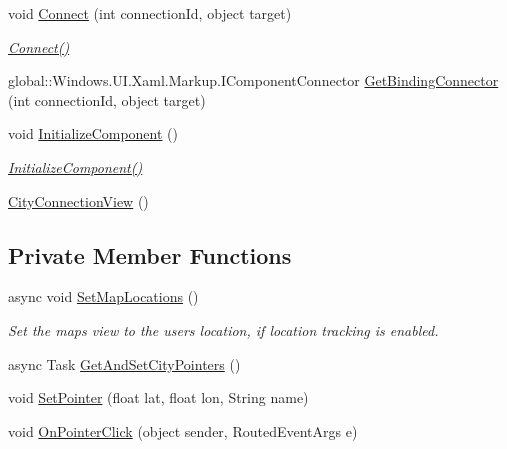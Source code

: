 \begin{DoxyCompactItemize}
void \hyperlink{class_e_l_i_client_1_1_views_1_1_city_connection_view_a55fa5d837de3be96ef7141ee6f29c3f3}{Connect} (int connection\+Id, object target)
\begin{DoxyCompactList}\small\item\em \hyperlink{class_e_l_i_client_1_1_views_1_1_city_connection_view_a55fa5d837de3be96ef7141ee6f29c3f3}{Connect()} \end{DoxyCompactList}\item 
global\+::\+Windows.\+U\+I.\+Xaml.\+Markup.\+I\+Component\+Connector \hyperlink{class_e_l_i_client_1_1_views_1_1_city_connection_view_a947cde31ff8c188fced9e4a3a33c3964}{Get\+Binding\+Connector} (int connection\+Id, object target)
\item 
void \hyperlink{class_e_l_i_client_1_1_views_1_1_city_connection_view_af7c195ef8947d0938788bc361077f177}{Initialize\+Component} ()
\begin{DoxyCompactList}\small\item\em \hyperlink{class_e_l_i_client_1_1_views_1_1_city_connection_view_af7c195ef8947d0938788bc361077f177}{Initialize\+Component()} \end{DoxyCompactList}\item 
\hyperlink{class_e_l_i_client_1_1_views_1_1_city_connection_view_a7cbd9995c6d5b65090de9dc901ca56ab}{City\+Connection\+View} ()
\end{DoxyCompactItemize}
\subsection*{Private Member Functions}
\begin{DoxyCompactItemize}
\item 
async void \hyperlink{class_e_l_i_client_1_1_views_1_1_city_connection_view_a555d2a0e3752bdbe5c75e9c1e2ac7167}{Set\+Map\+Locations} ()
\begin{DoxyCompactList}\small\item\em Set the maps view to the users location, if location tracking is enabled. \end{DoxyCompactList}\item 
async Task \hyperlink{class_e_l_i_client_1_1_views_1_1_city_connection_view_a6b98313a103b94f68425a9c20db647cc}{Get\+And\+Set\+City\+Pointers} ()
\item 
void \hyperlink{class_e_l_i_client_1_1_views_1_1_city_connection_view_a59e770542c3d562a2d928dcaf108442e}{Set\+Pointer} (float lat, float lon, String name)
\item 
void \hyperlink{class_e_l_i_client_1_1_views_1_1_city_connection_view_adee32ae376a8c30b2cf6d14a2bcb7191}{On\+Pointer\+Click} (object sender, Routed\+Event\+Args e)
\end{DoxyCompactItemize}
